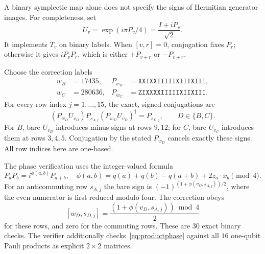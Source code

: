 \documentclass[11pt,a4paper]{article}
\newcommand{\pauli}[1]{\texttt{#1}}
\begin{document}
A binary symplectic map alone does not specify the signs of Hermitian generator images. For completeness, set
\begin{equation}\label{eq:unitary}
 U_v=\exp(i\pi P_v/4)=\frac{I+iP_v}{\sqrt2}.
\end{equation}
It implements $T_v$ on binary labels. When $[v,r]=0$, conjugation fixes $P_r$; otherwise it gives $iP_vP_r$, which is either $+P_{v+r}$ or $-P_{v+r}$.

Choose the correction labels
\begin{align}
 w_B&=17435,&P_{w_B}&=\pauli{XXIXXIIIIIXIIIXIII},\\
 w_C&=280636,&P_{w_C}&=\pauli{ZIXXXXIIIIIXIIXIII}.
\end{align}
For every row index $j=1,\ldots,15$, the exact, signed conjugations are
\begin{equation}\label{eq:exactclifford}
 (P_{w_D}U_{v_D})P_{s_{A,j}}(P_{w_D}U_{v_D})^\dagger
 =P_{s_{D,j}},\qquad D\in\{B,C\}.
\end{equation}
For $B$, bare $U_{v_B}$ introduces minus signs at rows $9,12$; for $C$, bare $U_{v_C}$ introduces them at rows $3,4,5$. Conjugation by the stated $P_{w_D}$ cancels exactly these signs. All row indices here are one-based.

The phase verification uses the integer-valued formula
\begin{equation}\label{eq:productphase}
 P_aP_b=i^{\phi(a,b)}P_{a+b},\quad
 \phi(a,b)=q(a)+q(b)-q(a+b)+2z_a\cdot x_b\pmod4.
\end{equation}
For an anticommuting row $s_{A,j}$ the bare sign is $(-1)^{(1+\phi(v_D,s_{A,j}))/2}$, where the even numerator is first reduced modulo four. The correction obeys
\[
 [w_D,s_{D,j}]=\frac{(1+\phi(v_D,s_{A,j}))\bmod4}{2}
\]
for these rows, and zero for the commuting rows. These are $30$ exact binary checks. The verifier additionally checks~\eqref{eq:productphase} against all $16$ one-qubit Pauli products as explicit $2\times2$ matrices.
\end{document}
